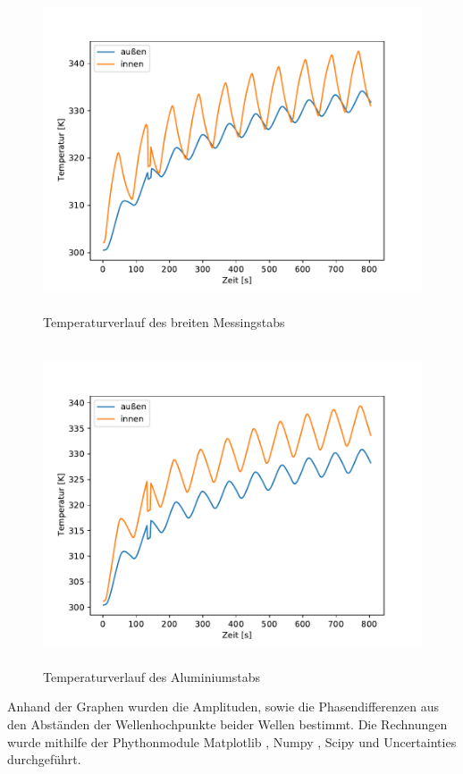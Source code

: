 \begin{figure}[H]
  \centering
  \includegraphics[height=9.5cm]{content/dyn_80_mess.pdf}
  \caption{Temperaturverlauf des breiten Messingstabs}
  \label{fig:mess_dyn}
\end{figure}
\begin{figure}[H]
  \centering
  \includegraphics[height=9.5cm]{content/dyn_80_alu.pdf}
  \caption{Temperaturverlauf des Aluminiumstabs}
  \label{fig:alu_dyn}
\end{figure}

\noindent Anhand der Graphen wurden die Amplituden, sowie die Phasendifferenzen aus den Abständen der Wellenhochpunkte beider Wellen bestimmt.
 Die Rechnungen wurde mithilfe der Phythonmodule Matplotlib \cite{matplotlib}, Numpy \cite{numpy}, Scipy \cite{scipy} und Uncertainties\cite{uncertainties} durchgeführt.
	
